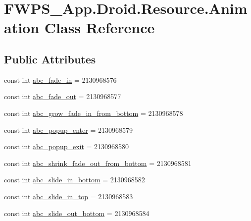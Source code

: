 \hypertarget{class_f_w_p_s___app_1_1_droid_1_1_resource_1_1_animation}{}\section{F\+W\+P\+S\+\_\+\+App.\+Droid.\+Resource.\+Animation Class Reference}
\label{class_f_w_p_s___app_1_1_droid_1_1_resource_1_1_animation}
\subsection*{Public Attributes}
\begin{DoxyCompactItemize}
\item 
const int \mbox{\hyperlink{class_f_w_p_s___app_1_1_droid_1_1_resource_1_1_animation_a4fd0fba3d3199d9079bdf6cc41cec8ce}{abc\+\_\+fade\+\_\+in}} = 2130968576
\item 
const int \mbox{\hyperlink{class_f_w_p_s___app_1_1_droid_1_1_resource_1_1_animation_aceaf4762feab2bc0468d1fcfb13e278d}{abc\+\_\+fade\+\_\+out}} = 2130968577
\item 
const int \mbox{\hyperlink{class_f_w_p_s___app_1_1_droid_1_1_resource_1_1_animation_aa569e7950eaf1640c3e3e116fcf7ef58}{abc\+\_\+grow\+\_\+fade\+\_\+in\+\_\+from\+\_\+bottom}} = 2130968578
\item 
const int \mbox{\hyperlink{class_f_w_p_s___app_1_1_droid_1_1_resource_1_1_animation_ab3fdf80bd34202590217e2019517c13c}{abc\+\_\+popup\+\_\+enter}} = 2130968579
\item 
const int \mbox{\hyperlink{class_f_w_p_s___app_1_1_droid_1_1_resource_1_1_animation_ad9412def75329ba8571081b5ac8b9705}{abc\+\_\+popup\+\_\+exit}} = 2130968580
\item 
const int \mbox{\hyperlink{class_f_w_p_s___app_1_1_droid_1_1_resource_1_1_animation_a7922f23ebaaeba8c8cc734d31eaa9f71}{abc\+\_\+shrink\+\_\+fade\+\_\+out\+\_\+from\+\_\+bottom}} = 2130968581
\item 
const int \mbox{\hyperlink{class_f_w_p_s___app_1_1_droid_1_1_resource_1_1_animation_ae2d647a6f4bfe6c4379cd6ed835fd2d0}{abc\+\_\+slide\+\_\+in\+\_\+bottom}} = 2130968582
\item 
const int \mbox{\hyperlink{class_f_w_p_s___app_1_1_droid_1_1_resource_1_1_animation_aed3774bb2c08bee50974fa125af917ad}{abc\+\_\+slide\+\_\+in\+\_\+top}} = 2130968583
\item 
const int \mbox{\hyperlink{class_f_w_p_s___app_1_1_droid_1_1_resource_1_1_animation_a04da8b832edd6a10bc0e553dd6f87677}{abc\+\_\+slide\+\_\+out\+\_\+bottom}} = 2130968584

\end{DoxyCompactItemize}
